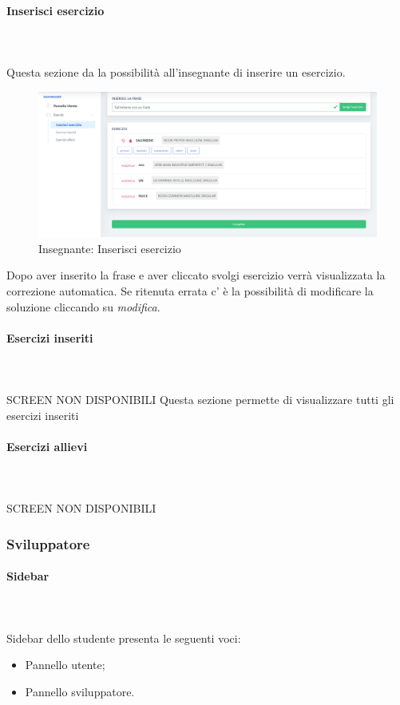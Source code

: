         \paragraph{Inserisci esercizio}\mbox{}\\ \\
        Questa sezione da la possibilità all'insegnante di inserire un esercizio.
        \begin{figure}[H]
            \centering
            \includegraphics[width=17cm]{sez/img/insegnante/inserisciEsercizio.png} 
            \caption{Insegnante: Inserisci esercizio}\label{fig:1}
        \end{figure}
        Dopo aver inserito la frase e aver cliccato svolgi esercizio verrà visualizzata
        la correzione automatica. Se ritenuta errata c' è la possibilità di modificare la 
        soluzione cliccando su \textit{modifica}.
        \paragraph{Esercizi inseriti}\mbox{}\\ \\
        SCREEN NON DISPONIBILI
        Questa sezione permette di visualizzare tutti gli esercizi inseriti
        \paragraph{Esercizi allievi}\mbox{}\\ \\
        SCREEN NON DISPONIBILI

    \subsubsection{Sviluppatore}
    
    \paragraph{Sidebar}\mbox{} \\
    \\Sidebar dello studente presenta le seguenti voci:
    \begin{itemize}
    \item Pannello utente;
    \item Pannello sviluppatore.
    \end{itemize}
